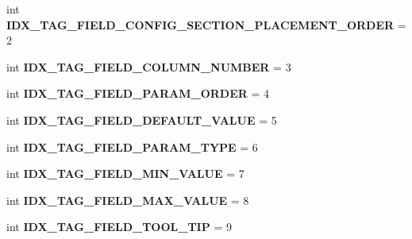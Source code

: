\begin{DoxyCompactItemize}
\item 
int {\bfseries I\+D\+X\+\_\+\+T\+A\+G\+\_\+\+F\+I\+E\+L\+D\+\_\+\+C\+O\+N\+F\+I\+G\+\_\+\+S\+E\+C\+T\+I\+O\+N\+\_\+\+P\+L\+A\+C\+E\+M\+E\+N\+T\+\_\+\+O\+R\+D\+ER} = 2\hypertarget{classnegui_1_1pgparamset_1_1PGParamSet_ace7214b6af0603080aa2d0ea3dea8ea7}{}\label{classnegui_1_1pgparamset_1_1PGParamSet_ace7214b6af0603080aa2d0ea3dea8ea7}

\item 
int {\bfseries I\+D\+X\+\_\+\+T\+A\+G\+\_\+\+F\+I\+E\+L\+D\+\_\+\+C\+O\+L\+U\+M\+N\+\_\+\+N\+U\+M\+B\+ER} = 3\hypertarget{classnegui_1_1pgparamset_1_1PGParamSet_a5c7895ecbfeefb1c547688bbbd790d6f}{}\label{classnegui_1_1pgparamset_1_1PGParamSet_a5c7895ecbfeefb1c547688bbbd790d6f}

\item 
int {\bfseries I\+D\+X\+\_\+\+T\+A\+G\+\_\+\+F\+I\+E\+L\+D\+\_\+\+P\+A\+R\+A\+M\+\_\+\+O\+R\+D\+ER} = 4\hypertarget{classnegui_1_1pgparamset_1_1PGParamSet_a51d57165381da82574640f89b0f2aecb}{}\label{classnegui_1_1pgparamset_1_1PGParamSet_a51d57165381da82574640f89b0f2aecb}

\item 
int {\bfseries I\+D\+X\+\_\+\+T\+A\+G\+\_\+\+F\+I\+E\+L\+D\+\_\+\+D\+E\+F\+A\+U\+L\+T\+\_\+\+V\+A\+L\+UE} = 5\hypertarget{classnegui_1_1pgparamset_1_1PGParamSet_ae133df1f32a04c7088151186a53af461}{}\label{classnegui_1_1pgparamset_1_1PGParamSet_ae133df1f32a04c7088151186a53af461}

\item 
int {\bfseries I\+D\+X\+\_\+\+T\+A\+G\+\_\+\+F\+I\+E\+L\+D\+\_\+\+P\+A\+R\+A\+M\+\_\+\+T\+Y\+PE} = 6\hypertarget{classnegui_1_1pgparamset_1_1PGParamSet_a026542525f9f02da7db6fa5ea86204fe}{}\label{classnegui_1_1pgparamset_1_1PGParamSet_a026542525f9f02da7db6fa5ea86204fe}

\item 
int {\bfseries I\+D\+X\+\_\+\+T\+A\+G\+\_\+\+F\+I\+E\+L\+D\+\_\+\+M\+I\+N\+\_\+\+V\+A\+L\+UE} = 7\hypertarget{classnegui_1_1pgparamset_1_1PGParamSet_ab182cc3f527e31c261b4875ae91fc012}{}\label{classnegui_1_1pgparamset_1_1PGParamSet_ab182cc3f527e31c261b4875ae91fc012}

\item 
int {\bfseries I\+D\+X\+\_\+\+T\+A\+G\+\_\+\+F\+I\+E\+L\+D\+\_\+\+M\+A\+X\+\_\+\+V\+A\+L\+UE} = 8\hypertarget{classnegui_1_1pgparamset_1_1PGParamSet_a88c95f2519ee9eb057f67cadb54283ab}{}\label{classnegui_1_1pgparamset_1_1PGParamSet_a88c95f2519ee9eb057f67cadb54283ab}

\item 
int {\bfseries I\+D\+X\+\_\+\+T\+A\+G\+\_\+\+F\+I\+E\+L\+D\+\_\+\+T\+O\+O\+L\+\_\+\+T\+IP} = 9\hypertarget{classnegui_1_1pgparamset_1_1PGParamSet_a5c414c29c9750f1bb49cfecee9ace56e}{}\label{classnegui_1_1pgparamset_1_1PGParamSet_a5c414c29c9750f1bb49cfecee9ace56e}


\end{DoxyCompactItemize}
